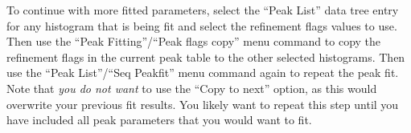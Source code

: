 To continue with more fitted parameters, select the ``Peak List'' data tree entry for any histogram that is being fit and select the refinement flags values to use. Then use the ``Peak Fitting''/``Peak flags copy'' menu command to copy the refinement flags in the current peak table to the other selected histograms. Then use the ``Peak List''/``Seq Peakfit'' menu command again to repeat the peak fit. Note that \textit{you do not want} to  use the ``Copy to next'' option, as this would overwrite your previous fit results. You likely want to repeat this step until you have included all peak parameters that you would want to fit.

